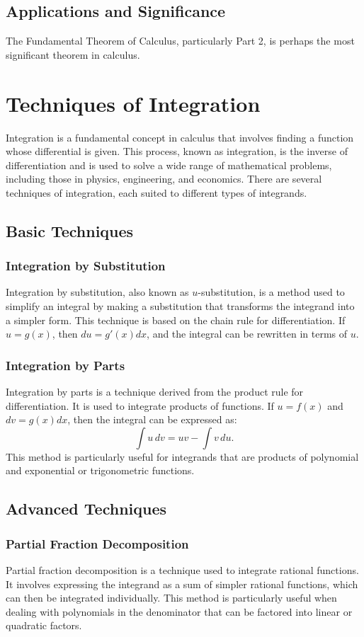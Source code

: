 \documentclass[12pt]{article}
\begin{document}
\subsection{Applications and Significance}
The Fundamental Theorem of Calculus, particularly Part 2, is perhaps the most significant theorem in calculus.

\section{Techniques of Integration}
Integration is a fundamental concept in calculus that involves finding a function whose differential is given. This process, known as integration, is the inverse of differentiation and is used to solve a wide range of mathematical problems, including those in physics, engineering, and economics. There are several techniques of integration, each suited to different types of integrands.

\subsection{Basic Techniques}
\subsubsection{Integration by Substitution}
Integration by substitution, also known as \( u \)-substitution, is a method used to simplify an integral by making a substitution that transforms the integrand into a simpler form. This technique is based on the chain rule for differentiation. If \( u = g(x) \), then \( du = g'(x)dx \), and the integral can be rewritten in terms of \( u \).

\subsubsection{Integration by Parts}
Integration by parts is a technique derived from the product rule for differentiation. It is used to integrate products of functions. If \( u = f(x) \) and \( dv = g(x)dx \), then the integral can be expressed as:
\[
\int u\,dv = uv - \int v\,du.
\]
This method is particularly useful for integrands that are products of polynomial and exponential or trigonometric functions.

\subsection{Advanced Techniques}
\subsubsection{Partial Fraction Decomposition}
Partial fraction decomposition is a technique used to integrate rational functions. It involves expressing the integrand as a sum of simpler rational functions, which can then be integrated individually. This method is particularly useful when dealing with polynomials in the denominator that can be factored into linear or quadratic factors.
\end{document}
